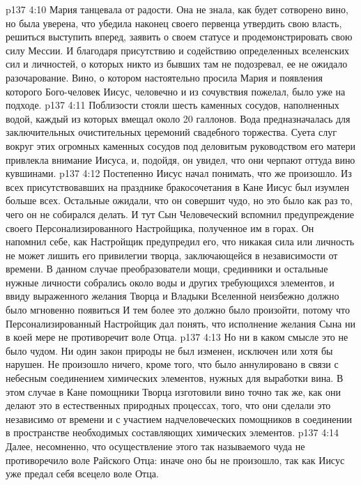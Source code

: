 \vs p137 4:10 Мария танцевала от радости. Она не знала, как будет сотворено вино, но была уверена, что убедила наконец своего первенца утвердить свою власть, решиться выступить вперед, заявить о своем статусе и продемонстрировать свою силу Мессии. И благодаря присутствию и содействию определенных вселенских сил и личностей, о которых никто из бывших там не подозревал, ее не ожидало разочарование. Вино, о котором настоятельно просила Мария и появления которого Бого\hyp{}человек Иисус, человечно и из сочувствия пожелал, было уже на подходе.
\vs p137 4:11 Поблизости стояли шесть каменных сосудов, наполненных водой, каждый из которых вмещал около 20 галлонов. Вода предназначалась для заключительных очистительных церемоний свадебного торжества. Суета слуг вокруг этих огромных каменных сосудов под деловитым руководством его матери привлекла внимание Иисуса, и, подойдя, он увидел, что они черпают оттуда вино кувшинами.
\vs p137 4:12 Постепенно Иисус начал понимать, что же произошло. Из всех присутствовавших на празднике бракосочетания в Кане Иисус был изумлен больше всех. Остальные ожидали, что он совершит чудо, но это было как раз то, чего он не собирался делать. И тут Сын Человеческий вспомнил предупреждение своего Персонализированного Настройщика, полученное им в горах. Он напомнил себе, как Настройщик предупредил его, что никакая сила или личность не может лишить его привилегии творца, заключающейся в независимости от времени. В данном случае преобразователи мощи, срединники и остальные нужные личности собрались около воды и других требующихся элементов, и ввиду выраженного желания Творца и Владыки Вселенной неизбежно должно было мгновенно появиться  И тем более это должно было произойти, потому что Персонализированный Настройщик дал понять, что исполнение желания Сына ни в коей мере не противоречит воле Отца.
\vs p137 4:13 Но ни в каком смысле это не было чудом. Ни один закон природы не был изменен, исключен или хотя бы нарушен. Не произошло ничего, кроме того, что было аннулировано  в связи с небесным соединением химических элементов, нужных для выработки вина. В этом случае в Кане помощники Творца изготовили вино точно так же, как они делают это в естественных природных процессах,  того, что они сделали это независимо от времени и с участием надчеловеческих помощников в соединении в пространстве необходимых составляющих химических элементов.
\vs p137 4:14 Далее, несомненно, что осуществление этого так называемого чуда не противоречило воле Райского Отца: иначе оно бы не произошло, так как Иисус уже предал себя всецело воле Отца.
